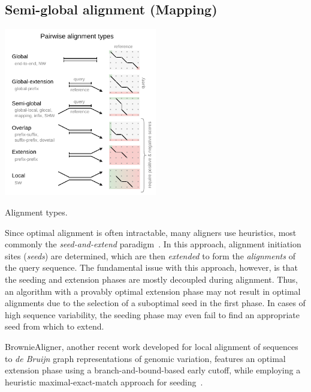 \subsection{Semi-global alignment (Mapping)}

\begin{floatingfigure}[l]{0.5\textwidth}
    \includegraphics[width=0.5\textwidth]{alignment-types}
	\caption[Alignment types]{Alignment types.}
    \label{fig:alignment-types}
\end{floatingfigure}

Since optimal alignment is often intractable, many aligners use heuristics, most
commonly the \emph{seed-and-extend}
paradigm~\cite{altschul_basic_1990,langmead_fast_2012,li_fast_2009}. In this
approach, alignment initiation sites (\emph{seeds}) are determined, which are
then \emph{extended} to form the \emph{alignments} of the query sequence. The
fundamental issue with this approach, however, is that the seeding and extension
phases are mostly decoupled during alignment. Thus, an algorithm with a provably
optimal extension phase may not result in optimal alignments due to the
selection of a suboptimal seed in the first phase. In cases of high sequence
variability, the seeding phase may even fail to find an appropriate seed from
which to extend.


BrownieAligner, another recent work developed for local alignment of sequences
to {\itshape de Bruijn} graph representations of genomic variation, features an
optimal extension phase using a branch-and-bound-based early cutoff, while
employing a heuristic maximal-exact-match approach for
seeding~\cite{heydari_browniealigner_2018}.
